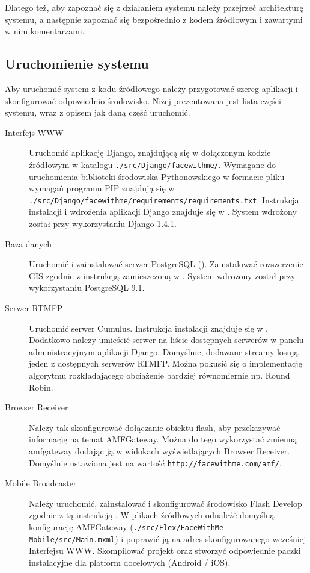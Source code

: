 Dlatego też, aby zapoznać się z działaniem systemu należy przejrzeć architekturę systemu, a następnie zapoznać się bezpośrednio z kodem źródłowym i zawartymi w nim komentarzami.

\subsection{Uruchomienie systemu}

Aby uruchomić system z kodu źródłowego należy przygotować szereg aplikacji i skonfigurować odpowiednio środowisko. Niżej prezentowana jest lista części systemu, wraz z opisem jak daną część uruchomić.

\begin{description}
    \item[Interfejs WWW] Uruchomić aplikację Django, znajdującą się w dołączonym kodzie źródłowym w katalogu \texttt{./src/Django/facewithme/}. Wymagane do uruchomienia biblioteki środowiska Pythonowskiego w formacie pliku wymagań programu PIP znajdują się w \texttt{./src/Django/facewithme/requirements/requirements.txt}. Instrukcja instalacji i wdrożenia aplikacji Django znajduje się w \cite{DjangoDocs}. System wdrożony został przy wykorzystaniu Django 1.4.1.
    \item[Baza danych] Uruchomić i zainstalować serwer PostgreSQL (\cite{PostgreSQL}). Zainstalować rozszerzenie GIS zgodnie z instrukcją zamieszczoną w \cite{DjangoPostGIS}. System wdrożony został przy wykorzystaniu PostgreSQL 9.1.
    \item[Serwer RTMFP] Uruchomić serwer Cumulus. Instrukcja instalacji znajduje się w \cite{CumulusInstall}. Dodatkowo należy umieścić serwer na liście dostępnych serwerów w panelu administracyjnym aplikacji Django. Domyślnie, dodawane streamy losują jeden z dostępnych serwerów RTMFP. Można pokusić się o implementację algorytmu rozkładającego obciążenie bardziej równomiernie np. Round Robin.
    \item[Browser Receiver] Należy tak skonfigurować dołączanie obiektu flash, aby przekazywać informację na temat AMFGateway. Można do tego wykorzystać zmienną amfgateway dodając ją w widokach wyświetlających Browser Receiver. Domyślnie ustawiona jest na wartość \texttt{http://facewithme.com/amf/}.
    \item[Mobile Broadcaster] Należy uruchomić, zainstalować i skonfigurować środowisko Flash Develop zgodnie z tą instrukcją \cite{flashDevelopConfig}. W plikach źródłowych odnaleźć domyślną konfigurację AMFGateway (\texttt{./src/Flex/FaceWithMe Mobile/src/Main.mxml}) i poprawić ją na adres skonfigurowanego wcześniej Interfejsu WWW. Skompilować projekt oraz stworzyć odpowiednie paczki instalacyjne dla platform docelowych (Android / iOS).
\end{description}

